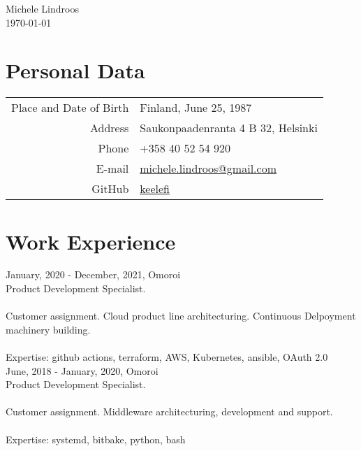 \documentclass[12pt]{article}
\begin{document}

\begin{center}
\Huge{Michele Lindroos} \\
\normalsize{\today}
\end{center}


\section*{Personal Data}
\begin{tabular}{rl}
Place and Date of Birth & Finland, June 25, 1987\\
Address & Saukonpaadenranta 4 B 32, Helsinki\\
Phone & +358 40 52 54 920\\
E-mail & \href{mailto:michele.lindroos@gmail.com}{michele.lindroos@gmail.com}\\
GitHub & \href{https://github.com/keelefi}{keelefi}
\end{tabular}


\section*{Work Experience}

\large{January, 2020 - December, 2021, Omoroi}\\
\normalsize{Product Development Specialist.}\\
\\
\normalsize{Customer assignment. Cloud product line architecturing. Continuous Delpoyment machinery building.}\\
\\
\normalsize{Expertise: github actions, terraform, AWS, Kubernetes, ansible, OAuth 2.0}\\

\large{June, 2018 - January, 2020, Omoroi}\\
\normalsize{Product Development Specialist.}\\
\\
\normalsize{Customer assignment. Middleware architecturing, development and support.}\\
\\
\normalsize{Expertise: systemd, bitbake, python, bash}\\
\end{document}

